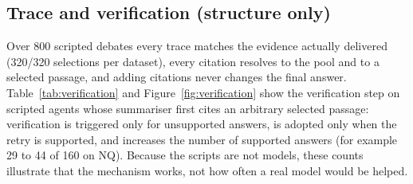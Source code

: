 \begin{table}[!htbp]
\centering
\small
\caption{Pool configurations (coverage = questions with an answer-bearing passage).}
\label{tab:poolcfg}
\setlength{\tabcolsep}{4pt}
\end{table}

\subsection{Trace and verification (structure only)}
Over 800 scripted debates every trace matches the evidence actually delivered (320/320 selections per dataset), every citation resolves to the pool and to a selected passage, and adding citations never changes the final answer. Table~\ref{tab:verification} and Figure~\ref{fig:verification} show the verification step on scripted agents whose summariser first cites an arbitrary selected passage: verification is triggered only for unsupported answers, is adopted only when the retry is supported, and increases the number of supported answers (for example 29 to 44 of 160 on NQ). Because the scripts are not models, these counts illustrate that the mechanism works, not how often a real model would be helped.

